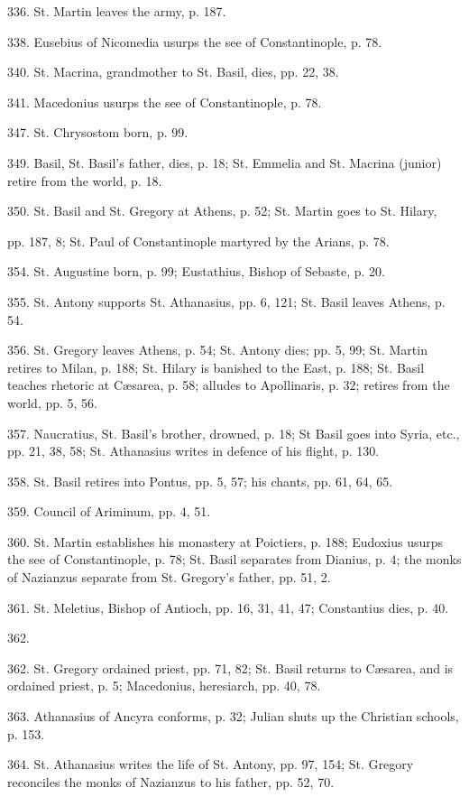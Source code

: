 336.
St. Martin leaves the army, p. 187.

338.
Eusebius of Nicomedia usurps the see of
Constantinople, p. 78.

340.
St. Macrina, grandmother to St. Basil, dies,
pp. 22, 38.

341.
Macedonius usurps the see of Constantinople, p.
78.

347.
St. Chrysostom born, p. 99.

349.
Basil, St. Basil's father, dies, p. 18; St.
Emmelia and St. Macrina (junior) retire from the world, p. 18.

350.
St. Basil and St. Gregory at Athens, p. 52; St.
Martin goes to St. Hilary, 

pp. 187, 8; St. Paul of Constantinople martyred by the Arians,
p. 78.

354.
St. Augustine born, p. 99; Eustathius, Bishop
of Sebaste, p. 20.

355.
St. Antony supports St. Athanasius, pp. 6, 121;
St. Basil leaves Athens, p. 54.

356.
St. Gregory leaves Athens, p. 54; St. Antony
dies; pp. 5, 99; St. Martin retires to Milan, p. 188; St.
Hilary is banished to the East, p. 188; St. Basil teaches
rhetoric at Cæsarea, p. 58; alludes to Apollinaris, p. 32;
retires from the world, pp. 5, 56.

357.
Naucratius, St. Basil's brother, drowned, p.
18; St Basil goes into Syria, etc., pp. 21, 38, 58; St.
Athanasius writes in defence of his flight, p. 130.

358.
St. Basil retires into Pontus, pp. 5, 57; his
chants, pp. 61, 64, 65.

359.
Council of Ariminum, pp. 4, 51.

360.
St. Martin establishes his monastery at
Poictiers, p. 188; Eudoxius usurps the see of Constantinople,
p. 78; St. Basil separates from Dianius, p. 4; the monks of
Nazianzus separate from St. Gregory's father, pp. 51, 2.

361.
St. Meletius, Bishop of Antioch, pp. 16, 31,
41, 47; Constantius dies, p. 40.

362.

362.
St. Gregory ordained priest, pp. 71, 82; St.
Basil returns to Cæsarea, and is ordained priest, p. 5;
Macedonius, heresiarch, pp. 40, 78.

363.
Athanasius of Ancyra conforms, p. 32; Julian
shuts up the Christian schools, p. 153.

364.
St. Athanasius writes the life of St. Antony,
pp. 97, 154; St. Gregory reconciles the monks of Nazianzus to
his father, pp. 52, 70.

